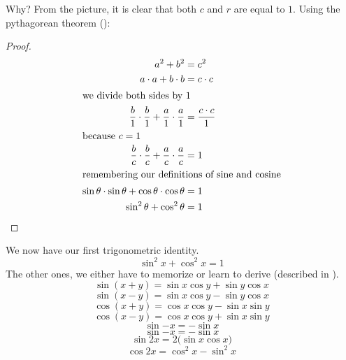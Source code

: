 Why? From the picture, it is clear that both $c$ and $r$ are equal to $1$. Using the pythagorean theorem ():
\begin{proof}\begin{align*}
  a^2+b^2&=c^2\\
  a\cdot a + b \cdot b &= c \cdot c \\
  \intertext{we divide both sides by 1}
  \frac{b}{1}\cdot\frac{b}{1}+\frac{a}{1}\cdot\frac{a}{1}
  &=\frac{c \cdot c}{1}\\
  \intertext{because $c=1$}
  \frac{b}{c}\cdot\frac{b}{c}+\frac{a}{c}\cdot\frac{a}{c}
  &=1\\
  \intertext{remembering our definitions of sine and cosine}
  \sin\theta \cdot \sin\theta + \cos\theta \cdot \cos\theta &=1\\
  \sin^2\theta + \cos^2\theta &=1\qedhere
\end{align*}\end{proof}
We now have our first trigonometric identity.
\begin{equation}
  \sin^2x+\cos^2x=1
  \label{eq:pythtrig}
\end{equation}
The other ones, we either have to memorize or learn to derive (described in ).
\begin{equation}
  \sin{(x+y)} = \sin x \cos y + \sin y \cos x
\end{equation}
\begin{equation}
  \sin{(x-y)} = \sin x \cos y - \sin y \cos x
\end{equation}
\begin{equation}
  \cos(x+y)=\cos x \cos y - \sin x \sin y
  \label{eq:cosxpy}
\end{equation}
\begin{equation}
  \cos(x-y)=\cos x \cos y + \sin x \sin y
\end{equation}
\begin{equation}
  \sin{-x}=-\sin x
\end{equation}
\begin{equation}
  \sin{-x}=-\sin x
\end{equation}
\begin{equation}
  \sin{2x}=2 \big( \sin x \cos x \big)
\end{equation}
\begin{equation}
  \cos{2x}=\cos^2x-\sin^2x
\end{equation}


